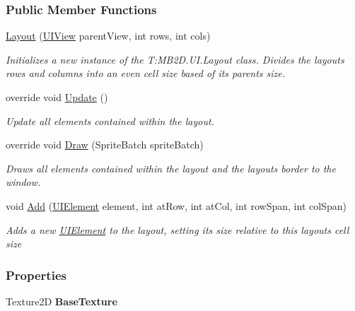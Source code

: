 \subsubsection*{Public Member Functions}
\begin{DoxyCompactItemize}
\item 
\hyperlink{class_m_b2_d_1_1_u_i_1_1_layout_a86bd9b8fde99644021327ce66b71d0b5}{Layout} (\hyperlink{class_m_b2_d_1_1_u_i_1_1_u_i_view}{U\+I\+View} parent\+View, int rows, int cols)
\begin{DoxyCompactList}\small\item\em Initializes a new instance of the T\+:\+M\+B2\+D.\+U\+I.\+Layout class. Divides the layouts rows and columns into an even cell size based of its parents size. \end{DoxyCompactList}\item 
override void \hyperlink{class_m_b2_d_1_1_u_i_1_1_layout_a88af7d81c8eecdca29c04e2616b69c0c}{Update} ()
\begin{DoxyCompactList}\small\item\em Update all elements contained within the layout. \end{DoxyCompactList}\item 
override void \hyperlink{class_m_b2_d_1_1_u_i_1_1_layout_ae018eee922839254b46610216843afa7}{Draw} (Sprite\+Batch sprite\+Batch)
\begin{DoxyCompactList}\small\item\em Draws all elements contained within the layout and the layouts border to the window. \end{DoxyCompactList}\item 
void \hyperlink{class_m_b2_d_1_1_u_i_1_1_layout_aef7a54a9b1c195a99cdd83d1d526ddd4}{Add} (\hyperlink{class_m_b2_d_1_1_u_i_1_1_u_i_element}{U\+I\+Element} element, int at\+Row, int at\+Col, int row\+Span, int col\+Span)
\begin{DoxyCompactList}\small\item\em Adds a new \hyperlink{class_m_b2_d_1_1_u_i_1_1_u_i_element}{U\+I\+Element} to the layout, setting its size relative to this layouts cell size \end{DoxyCompactList}\end{DoxyCompactItemize}
\subsubsection*{Properties}
\begin{DoxyCompactItemize}
\item 
\hypertarget{class_m_b2_d_1_1_u_i_1_1_layout_a451dc6b22cf15cfe0660caa9c29f9767}{}\label{class_m_b2_d_1_1_u_i_1_1_layout_a451dc6b22cf15cfe0660caa9c29f9767} 
Texture2D {\bfseries Base\+Texture}
\end{DoxyCompactItemize}
